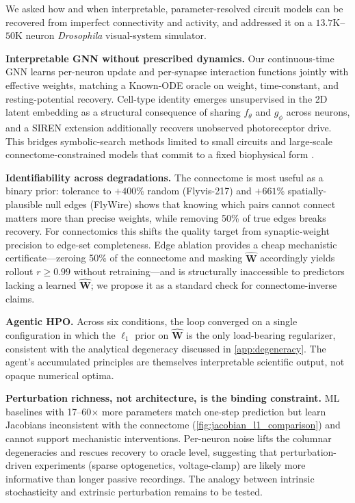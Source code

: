 \documentclass{article}
\begin{document}
{\color{red}%
We asked how and when interpretable, parameter-resolved circuit models can be recovered from imperfect connectivity and activity, and addressed it on a $13.7$K--$50$K neuron \emph{Drosophila} visual-system simulator.

\textbf{Interpretable GNN without prescribed dynamics.} Our continuous-time GNN learns per-neuron update and per-synapse interaction functions jointly with effective weights, matching a Known-ODE oracle on weight, time-constant, and resting-potential recovery.
Cell-type identity emerges unsupervised in the 2D latent embedding as a structural consequence of sharing $f_\theta$ and $g_\phi$ across neurons, and a SIREN extension additionally recovers unobserved photoreceptor drive.
This bridges symbolic-search methods limited to small circuits \citep{lueckmann_discovering_2026} and large-scale connectome-constrained models that commit to a fixed biophysical form \citep{mi_connectome-constrained_2021,lappalainen_connectome-constrained_2024,pospisil_fly_2024}.

\textbf{Identifiability across degradations.} The connectome is most useful as a binary prior: tolerance to $+400$\% random (Flyvis-217) and $+661$\% spatially-plausible null edges (FlyWire) shows that knowing which pairs cannot connect matters more than precise weights, while removing 50\% of true edges breaks recovery.
For connectomics this shifts the quality target from synaptic-weight precision to edge-set completeness.
Edge ablation provides a cheap mechanistic certificate---zeroing 50\% of the connectome and masking $\hat{\mathbf{W}}$ accordingly yields rollout $r \geq 0.99$ without retraining---and is structurally inaccessible to predictors lacking a learned $\hat{\mathbf{W}}$; we propose it as a standard check for connectome-inverse claims.

\textbf{Agentic HPO.} Across six conditions, the loop converged on a single configuration in which the $\ell_1$ prior on $\hat{\mathbf{W}}$ is the only load-bearing regularizer, consistent with the analytical degeneracy discussed in \cref{app:degeneracy}.  The agent's accumulated principles are themselves interpretable scientific output, not opaque numerical optima.

\textbf{Perturbation richness, not architecture, is the binding constraint.} ML baselines with 17--60$\times$ more parameters match one-step prediction but learn Jacobians inconsistent with the connectome (\cref{fig:jacobian_l1_comparison}) and cannot support mechanistic interventions.
Per-neuron noise lifts the columnar degeneracies and rescues recovery to oracle level, suggesting that perturbation-driven experiments (sparse optogenetics, voltage-clamp) are likely more informative than longer passive recordings.  The analogy between intrinsic stochasticity and extrinsic perturbation remains to be tested.


}
\end{document}
